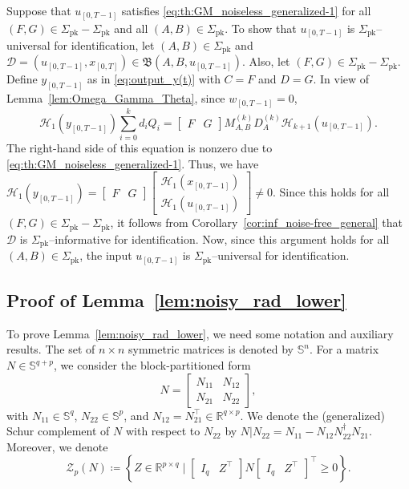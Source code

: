 \documentclass[journal,twoside,web]{ieeecolor}
\newcommand{\set}[2]{\left\{#1 \mid #2\right\}}
\begin{document}
Suppose that $u_{[0,T-1]}$ satisfies \eqref{eq:th:GM_noiseless_generalized-1} for all \mbox{$(F,G)\in\Sigma_\text{pk}-\Sigma_\text{pk}$} and all \mbox{$(A,B)\in\Sigma_\text{pk}$}. To show that $u_{[0,T-1]}$ is $\Sigma_\text{pk}$--universal for identification, let $(A,B)\in\Sigma_\text{pk}$ and $\mathcal{D}=(u_{[0,T-1]},x_{[0,T]})\in\mathfrak{B}(A,B,u_{[0,T-1]})$. Also, let \mbox{$(F,G)\in\Sigma_\text{pk}-\Sigma_\text{pk}$}. Define $y_{[0,T-1]}$ as in \eqref{eq:output_y(t)} with $C=F$ and $D=G$. In view of Lemma~\ref{lem:Omega_Gamma_Theta}, since $w_{[0,T-1]}=0$, 
\begin{equation}
\label{eq:th:GM_noiseless_generalized-6}
\mathcal{H}_1(y_{[0,T-1]})\sum_{i=0}^{k}d_iQ_i=\begin{bmatrix}
F & G
\end{bmatrix}M_{A,B}^{(k)}D_A^{(k)}\mathcal{H}_{k+1}(u_{[0,T-1]}).
\end{equation}
The right-hand side of this equation is nonzero due to \eqref{eq:th:GM_noiseless_generalized-1}. Thus, we have $\mathcal{H}_1(y_{[0,T-1]})=\begin{bmatrix}
F & G
\end{bmatrix}\begin{bmatrix}
\mathcal{H}_{1}(x_{[0,T-1]}) \\ \mathcal{H}_{1}(u_{[0,T-1]})
\end{bmatrix}\neq 0$. Since this holds for all \mbox{$(F,G)\in\Sigma_\text{pk}-\Sigma_\text{pk}$}, it follows from Corollary~\ref{cor:inf_noise-free_general} that $\mathcal{D}$ is \mbox{$\Sigma_\text{pk}$--informative} for identification. Now, since this argument holds for all $(A,B)\in\Sigma_\text{pk}$, the input $u_{[0,T-1]}$ is \mbox{$\Sigma_\text{pk}$--universal} for identification. \hfill \QED

\subsection{Proof of Lemma~\ref{lem:noisy_rad_lower}}
\label{app:F}

To prove Lemma~\ref{lem:noisy_rad_lower}, we need some notation and auxiliary results. The set of $n\times n$ symmetric matrices is denoted by $\mathbb{S}^n$. For a matrix $N\in\mathbb{S}^{q+p}$, we consider the block-partitioned form
\begin{equation}
\label{eq:N_partition}
N=\begin{bmatrix}
N_{11} & N_{12} \\
N_{21} & N_{22}
\end{bmatrix},
\end{equation}
with $N_{11}\in\mathbb{S}^q$, $N_{22}\in\mathbb{S}^p$, and $N_{12}=N_{21}^\top\in\mathbb{R}^{q\times p}$. We denote the (generalized) Schur complement of $N$ with respect to $N_{22}$ by $N|N_{22}=N_{11}-N_{12}N_{22}^\dagger N_{21}$. Moreover, we denote
\begin{equation}
\mathcal{Z}_p(N)\coloneqq\set{Z\in\mathbb{R}^{p\times q}}{\begin{bmatrix}
I_q & Z^\top
\end{bmatrix} N \begin{bmatrix}
I_q & Z^\top
\end{bmatrix}^\top\geq 0}.
\end{equation}
\end{document}
